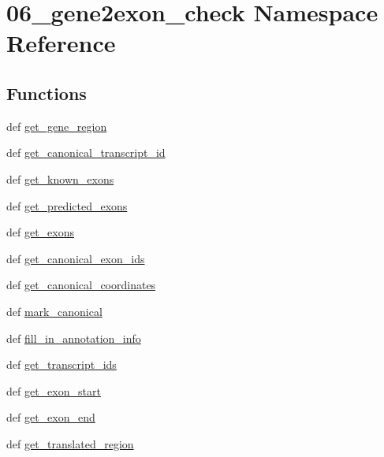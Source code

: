 \hypertarget{namespace06__gene2exon__check}{\section{06\-\_\-gene2exon\-\_\-check Namespace Reference}
\label{namespace06__gene2exon__check}
}
\subsection*{Functions}
\begin{DoxyCompactItemize}
\item 
def \hyperlink{namespace06__gene2exon__check_ad113015aa5373c3044ff0b3d513148e1}{get\-\_\-gene\-\_\-region}
\item 
def \hyperlink{namespace06__gene2exon__check_a5d0469db9987e7e5a06d1db94d7425d6}{get\-\_\-canonical\-\_\-transcript\-\_\-id}
\item 
def \hyperlink{namespace06__gene2exon__check_aa5a83ccb27f5703de9d1df48c3321006}{get\-\_\-known\-\_\-exons}
\item 
def \hyperlink{namespace06__gene2exon__check_a0cf4a310bd0d9e70414f20e0f2ba958f}{get\-\_\-predicted\-\_\-exons}
\item 
def \hyperlink{namespace06__gene2exon__check_ac24b84ec44d058346c65c5eea8ae6cf1}{get\-\_\-exons}
\item 
def \hyperlink{namespace06__gene2exon__check_a41ac7a521cfe1db7c39b8b70d6253820}{get\-\_\-canonical\-\_\-exon\-\_\-ids}
\item 
def \hyperlink{namespace06__gene2exon__check_a2f18ccc53e2e61e6c9897ae92e993454}{get\-\_\-canonical\-\_\-coordinates}
\item 
def \hyperlink{namespace06__gene2exon__check_a8dd20aae9f0db08950baf2c744ae06a1}{mark\-\_\-canonical}
\item 
def \hyperlink{namespace06__gene2exon__check_adf48438a2822e643f0537023a19fae6e}{fill\-\_\-in\-\_\-annotation\-\_\-info}
\item 
def \hyperlink{namespace06__gene2exon__check_a0c6190e953813ecaf189c2cfeefc675c}{get\-\_\-transcript\-\_\-ids}
\item 
def \hyperlink{namespace06__gene2exon__check_a6d87fd128384a6f6dcfb20a7d7461026}{get\-\_\-exon\-\_\-start}
\item 
def \hyperlink{namespace06__gene2exon__check_a7721060679f4c6e475c3115980325160}{get\-\_\-exon\-\_\-end}
\item 
def \hyperlink{namespace06__gene2exon__check_aae0e98bb128042e39c0a064f08306576}{get\-\_\-translated\-\_\-region}

\end{DoxyCompactItemize}
